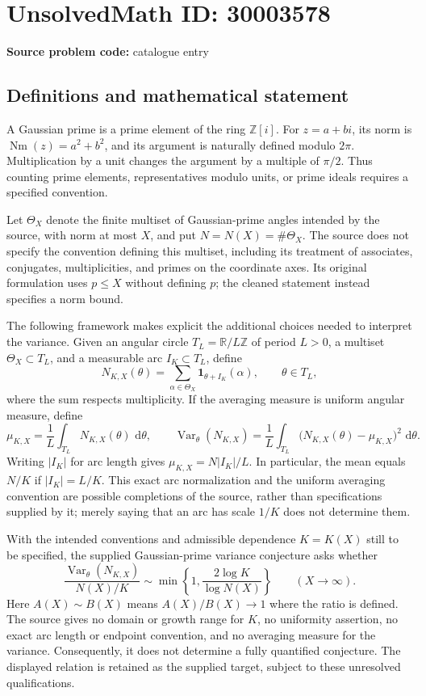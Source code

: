 \documentclass[11pt]{article}
\newcommand{\Z}{\mathbb{Z}}
\newcommand{\R}{\mathbb{R}}
\newcommand{\dd}{\,\mathrm{d}}
\begin{document}
\section*{UnsolvedMath ID: 30003578}
\textbf{Source problem code:} catalogue entry
\subsection{Definitions and mathematical statement}
A Gaussian prime is a prime element of the ring \(\Z[i]\). For \(z=a+bi\), its norm is \(\operatorname{Nm}(z)=a^2+b^2\), and its argument is naturally defined modulo \(2\pi\). Multiplication by a unit changes the argument by a multiple of \(\pi/2\). Thus counting prime elements, representatives modulo units, or prime ideals requires a specified convention.

Let \(\Theta_X\) denote the finite multiset of Gaussian-prime angles intended by the source, with norm at most \(X\), and put \(N=N(X)=\#\Theta_X\). The source does not specify the convention defining this multiset, including its treatment of associates, conjugates, multiplicities, and primes on the coordinate axes. Its original formulation uses \(p\leq X\) without defining \(p\); the cleaned statement instead specifies a norm bound.

The following framework makes explicit the additional choices needed to interpret the variance. Given an angular circle \(T_L=\R/L\Z\) of period \(L>0\), a multiset \(\Theta_X\subset T_L\), and a measurable arc \(I_K\subset T_L\), define
\[
N_{K,X}(\theta)=\sum_{\alpha\in\Theta_X}\mathbf{1}_{\theta+I_K}(\alpha),\qquad \theta\in T_L,
\]
where the sum respects multiplicity. If the averaging measure is uniform angular measure, define
\[
\mu_{K,X}=\frac1L\int_{T_L}N_{K,X}(\theta)\,\dd\theta,
\qquad
\operatorname{Var}_{\theta}(N_{K,X})
=\frac1L\int_{T_L}\bigl(N_{K,X}(\theta)-\mu_{K,X}\bigr)^2\,\dd\theta.
\]
Writing \(|I_K|\) for arc length gives \(\mu_{K,X}=N|I_K|/L\). In particular, the mean equals \(N/K\) if \(|I_K|=L/K\). This exact arc normalization and the uniform averaging convention are possible completions of the source, rather than specifications supplied by it; merely saying that an arc has scale \(1/K\) does not determine them.

With the intended conventions and admissible dependence \(K=K(X)\) still to be specified, the supplied Gaussian-prime variance conjecture asks whether
\[
\frac{\operatorname{Var}_{\theta}(N_{K,X})}{N(X)/K}
\sim
\min\!\left\{1,\frac{2\log K}{\log N(X)}\right\}
\qquad (X\to\infty).
\]
Here \(A(X)\sim B(X)\) means \(A(X)/B(X)\to1\) where the ratio is defined. The source gives no domain or growth range for \(K\), no uniformity assertion, no exact arc length or endpoint convention, and no averaging measure for the variance. Consequently, it does not determine a fully quantified conjecture. The displayed relation is retained as the supplied target, subject to these unresolved qualifications.
\end{document}

